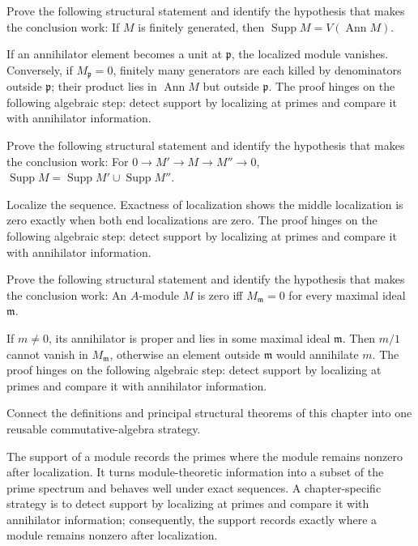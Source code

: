 \begin{problem}\label{prob:v16-problem-09}
Prove the following structural statement and identify the hypothesis that makes the conclusion work: If $M$ is finitely generated, then $\operatorname{Supp}M=V(\operatorname{Ann}M)$.
\end{problem}
\begin{solution}
If an annihilator element becomes a unit at $\mathfrak p$, the localized module vanishes. Conversely, if $M_{\mathfrak p}=0$, finitely many generators are each killed by denominators outside $\mathfrak p$; their product lies in $\operatorname{Ann}M$ but outside $\mathfrak p$. The proof hinges on the following algebraic step: detect support by localizing at primes and compare it with annihilator information.
\end{solution}

\begin{problem}\label{prob:v16-problem-10}
Prove the following structural statement and identify the hypothesis that makes the conclusion work: For $0\to M'\to M\to M''\to0$, $\operatorname{Supp}M=\operatorname{Supp}M'\cup\operatorname{Supp}M''$.
\end{problem}
\begin{solution}
Localize the sequence. Exactness of localization shows the middle localization is zero exactly when both end localizations are zero. The proof hinges on the following algebraic step: detect support by localizing at primes and compare it with annihilator information.
\end{solution}

\begin{problem}\label{prob:v16-problem-11}
Prove the following structural statement and identify the hypothesis that makes the conclusion work: An $A$-module $M$ is zero iff $M_{\mathfrak m}=0$ for every maximal ideal $\mathfrak m$.
\end{problem}
\begin{solution}
If $m\ne0$, its annihilator is proper and lies in some maximal ideal $\mathfrak m$. Then $m/1$ cannot vanish in $M_{\mathfrak m}$, otherwise an element outside $\mathfrak m$ would annihilate $m$. The proof hinges on the following algebraic step: detect support by localizing at primes and compare it with annihilator information.
\end{solution}

\begin{problem}\label{prob:v16-problem-12}
Connect the definitions and principal structural theorems of this chapter into one reusable commutative-algebra strategy.
\end{problem}
\begin{solution}
The support of a module records the primes where the module remains nonzero after localization. It turns module-theoretic information into a subset of the prime spectrum and behaves well under exact sequences. A chapter-specific strategy is to detect support by localizing at primes and compare it with annihilator information; consequently, the support records exactly where a module remains nonzero after localization.
\end{solution}

